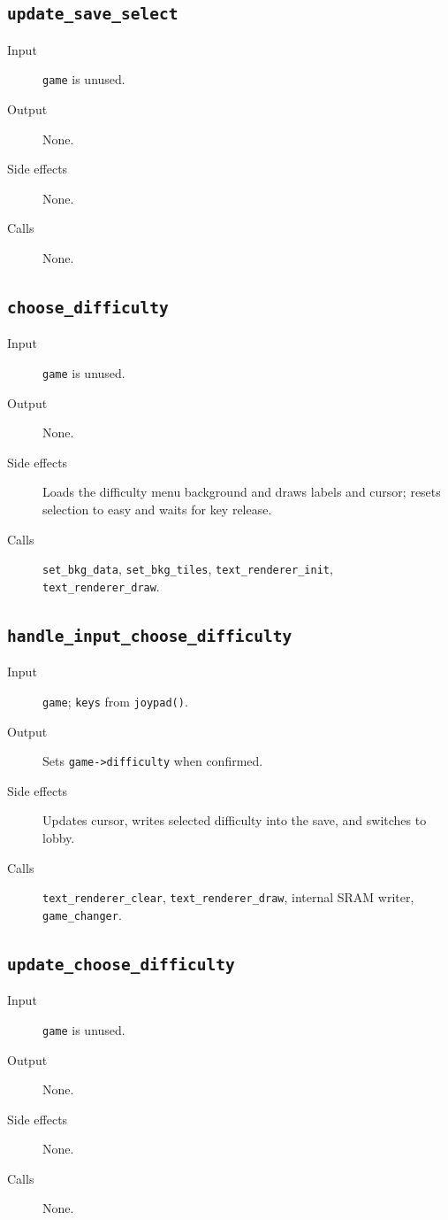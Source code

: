 \subsection*{\texttt{update\_save\_select}}
\begin{description}
  \item[Input] \texttt{game} is unused.
  \item[Output] None.
  \item[Side effects] None.
  \item[Calls] None.
\end{description}

\subsection*{\texttt{choose\_difficulty}}
\begin{description}
  \item[Input] \texttt{game} is unused.
  \item[Output] None.
  \item[Side effects] Loads the difficulty menu background and draws labels and cursor; resets selection to easy and waits for key release.
  \item[Calls] \texttt{set\_bkg\_data}, \texttt{set\_bkg\_tiles}, \texttt{text\_renderer\_init}, \texttt{text\_renderer\_draw}.
\end{description}

\subsection*{\texttt{handle\_input\_choose\_difficulty}}
\begin{description}
  \item[Input] \texttt{game}; \texttt{keys} from \texttt{joypad()}.
  \item[Output] Sets \texttt{game->difficulty} when confirmed.
  \item[Side effects] Updates cursor, writes selected difficulty into the save, and switches to lobby.
  \item[Calls] \texttt{text\_renderer\_clear}, \texttt{text\_renderer\_draw}, internal SRAM writer, \texttt{game\_changer}.
\end{description}

\subsection*{\texttt{update\_choose\_difficulty}}
\begin{description}
  \item[Input] \texttt{game} is unused.
  \item[Output] None.
  \item[Side effects] None.
  \item[Calls] None.
\end{description}

